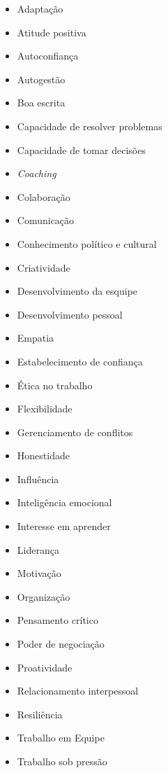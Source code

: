 \begin{itemize}
	\label{softskills}
	\item Adaptação
	\item Atitude positiva
	\item Autoconfiança
	\item Autogestão
	\item Boa escrita
	\item Capacidade de resolver problemas
	\item Capacidade de tomar decisões
	\item \textit{Coaching}
	\item Colaboração
	\item Comunicação
	\item Conhecimento político e cultural
	\item Criatividade
	\item Desenvolvimento da esquipe
	\item Desenvolvimento pessoal
	\item Empatia
	\item Estabelecimento de confiança
	\item Ética no trabalho
	\item Flexibilidade
	\item Gerenciamento de conflitos
	\item Honestidade
	\item Influência
	\item Inteligência emocional
	\item Interesse em aprender
	\item Liderança
	\item Motivação
	\item Organização
	\item Pensamento crítico
	\item Poder de negociação
	\item Proatividade
	\item Relacionamento interpessoal
	\item Resiliência
	\item Trabalho em Equipe
	\item Trabalho sob pressão
\end{itemize}